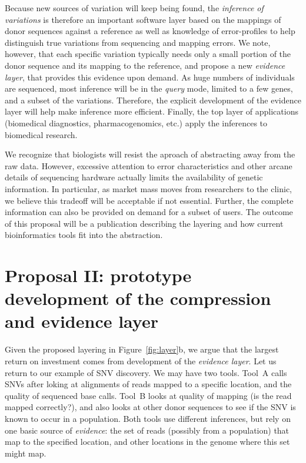 \documentclass[10pt]{article}
\begin{document}
Because new sources of variation will keep being found, the
\emph{inference of variations} is therefore an important software
layer based on the mappings of donor sequences against a reference as
well as knowledge of error-profiles to help distinguish true
variations from sequencing and mapping errors. We note, however, that
each specific variation typically needs only a small portion of the
donor sequence and its mapping to the reference, and propose a new
\emph{evidence layer}, that provides this evidence upon demand. As
huge numbers of individuals are sequenced, most inference will be in
the \emph{query} mode, limited to a few genes, and a subset of the
variations. Therefore, the explicit development of the evidence layer
will help make inference more efficient. Finally, the top
layer of applications (biomedical diagnostics, pharmacogenomics, etc.)
apply the inferences to biomedical research.

We recognize that biologists will resist the aproach of abstracting
away from the raw data.  However, excessive attention to error
characteristics and other arcane details of sequencing hardware
actually limits the availability of genetic information. In
particular, as market mass moves from researchers to the clinic, we
believe this tradeoff will be acceptable if not essential. Further,
the complete information can also be provided on demand for a subset
of users. The outcome of this proposal will be a publication
describing the layering and how current bioinformatics tools fit into
the abstraction. 

\section{Proposal II: prototype development of the compression and evidence layer}
Given the proposed layering in Figure~\ref{fig:layer}b, we argue that
the largest return on investment comes from development of the
\emph{evidence layer}. Let us return to our example of SNV
discovery. We may have two tools. Tool~A calls SNVs after loking at
alignments of reads mapped to a specific location, and the quality of
sequenced base calls. Tool~B looks at quality of mapping (is the read
mapped correctly?), and also looks at other donor sequences to see if
the SNV is known to occur in a population. Both tools use different
inferences, but rely on one basic source of \emph{evidence}: the set
of reads (possibly from a population) that map to the specified
location, and other locations in the genome where this set might map.
\end{document}
